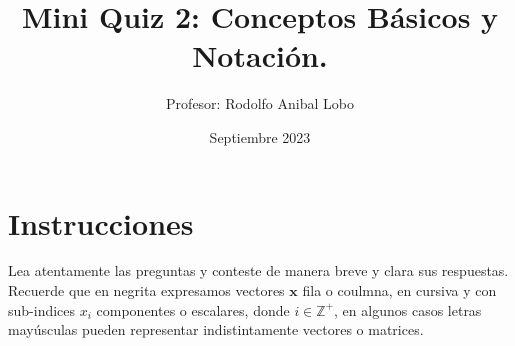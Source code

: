\documentclass{exam}
\title{Mini Quiz 2: Conceptos Básicos y Notación.}
\author{Profesor: Rodolfo Anibal Lobo}
\date{Septiembre 2023}
\theoremstyle{definition}
\begin{document}
\maketitle



\section*{Instrucciones}
\thispagestyle{empty}
Lea atentamente las preguntas y conteste de manera breve y clara sus respuestas. Recuerde que en negrita expresamos vectores $\mathbf{x}$ fila o coulmna, en cursiva y con sub-indices $x_i$ componentes o escalares, donde $i\in \mathbb{Z}^{+}$, en algunos casos letras mayúsculas pueden representar indistintamente vectores o matrices.
\end{document}
